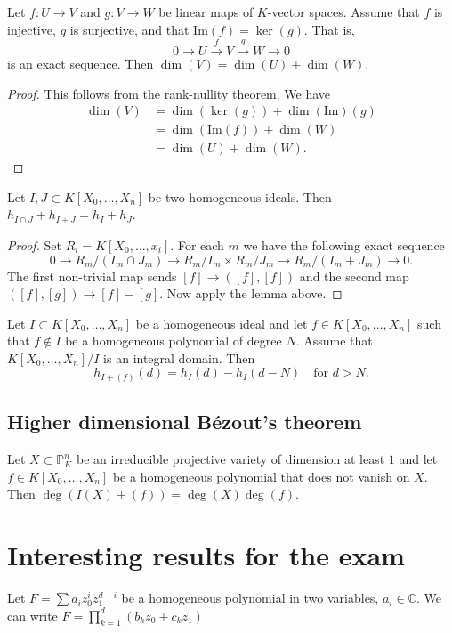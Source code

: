 \documentclass[12pt, a4paper]{article}
\newcommand{\PP}{\mathbb P}
\begin{document}
\begin{lemma}
    Let \(f:U\to V\) and \(g: V \to W\) be linear maps of \(K\)-vector spaces. Assume that \(f\) is injective, \(g\) is surjective, and that \(\text{Im}(f)=\ker(g)\). That is,
    \[0 \to U \xrightarrow{f} V \xrightarrow{g} W \to 0\]
    is an exact sequence. Then \(\dim(V)=\dim(U)+\dim(W)\).
\end{lemma}

\begin{proof}
    This follows from the rank-nullity theorem. We have 
    \[\begin{aligned}
        \dim(V)&=\dim(\ker(g))+\dim(\text{Im})(g) \\
        &=\dim(\text{Im}(f))+\dim(W) \\
        &= \dim(U)+\dim(W).
    \end{aligned}\]
\end{proof}

\begin{mdprop}
    Let \(I, J \subset K[X_0,\ldots,X_n]\) be two homogeneous ideals. Then \(h_{I \cap J}+h_{I+J}=h_I+h_J\).
\end{mdprop}

\begin{proof}
    Set \(R_i =K[X_0,\ldots,x_i] \). For each \(m\) we have the following exact sequence 
    \[0 \to R_m/(I_m \cap J_m) \to R_m/I_m \times R_m/J_m \to R_m/(I_m+J_m) \to 0.\]
    The first non-trivial map sends \([f] \to ([f],[f])\) and the second map \(([f],[g]) \to [f]-[g]\). Now apply the lemma above.
\end{proof}

\begin{lemma}
    Let \(I \subset K[X_0,\ldots,X_n]\) be a homogeneous ideal and let \(f\in K[X_0,\ldots,X_n]\) such that \(f\not\in I\) be a homogeneous polynomial of degree \(N\). Assume that \(K[X_0,\ldots,X_n]/I\) is an integral domain. Then 
    \[h_{I+(f)}(d)=h_I(d)-h_I(d-N) \quad \text{for } d>N.\]
\end{lemma}

\subsection{Higher dimensional Bézout's theorem}

\begin{mdthm}
    Let \(X \subset \PP^n_K\) be an irreducible projective variety of dimension at least \(1\) and let \(f\in K[X_0,\ldots,X_n]\) be a homogeneous polynomial that does not vanish on \(X\). Then \(\deg(I(X)+(f))=\deg(X)\deg(f)\).
\end{mdthm}

\section{Interesting results for the exam}

\begin{mdthm}
    Let \( F = \sum a_i z_0^i z_1^{d-i} \) be a homogeneous polynomial in two variables, \( a_i \in \mathbb{C} \). We can write \( F = \prod_{k=1}^d (b_k z_0 + c_k z_1) \)
\end{mdthm}
\end{document}
